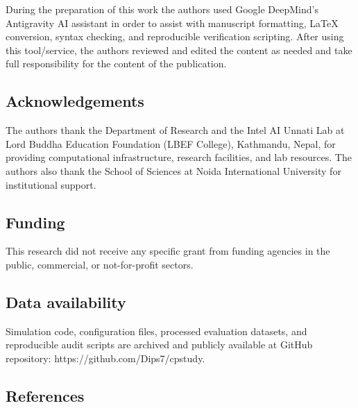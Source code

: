 \documentclass[
]{article}
\begin{document}
During the preparation of this work the authors used Google DeepMind's
Antigravity AI assistant in order to assist with manuscript formatting,
LaTeX conversion, syntax checking, and reproducible verification
scripting. After using this tool/service, the authors reviewed and
edited the content as needed and take full responsibility for the
content of the publication.

\subsection{Acknowledgements}\label{acknowledgements}

The authors thank the Department of Research and the Intel AI Unnati Lab
at Lord Buddha Education Foundation (LBEF College), Kathmandu, Nepal,
for providing computational infrastructure, research facilities, and lab
resources. The authors also thank the School of Sciences at Noida
International University for institutional support.

\subsection{Funding}\label{funding}

This research did not receive any specific grant from funding agencies
in the public, commercial, or not-for-profit sectors.

\subsection{Data availability}\label{data-availability}

Simulation code, configuration files, processed evaluation datasets, and
reproducible audit scripts are archived and publicly available at GitHub
repository: https://github.com/Dips7/cpstudy.

\subsection{References}\label{references}
\end{document}
